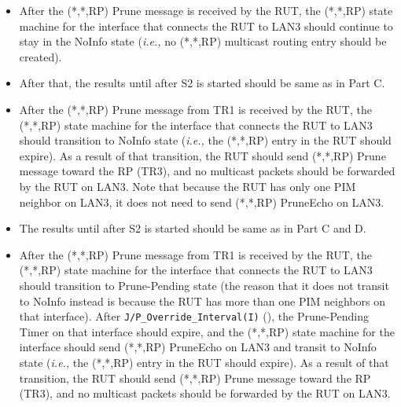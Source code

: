 \documentclass[11pt]{report}
\newcommand{\ie}{\emph{i.e.,}\xspace}
\begin{document}
\begin{itemize}

  \item After the (*,*,RP) Prune message is received by the RUT,
  the (*,*,RP) state machine for the interface that connects the RUT to
  LAN3 should continue to stay in the NoInfo state (\ie no (*,*,RP) multicast
  routing entry should be created).

  \item After that, the results until after S2 is started should be same as in
  Part C.

  \item After the (*,*,RP) Prune message from TR1 is received by the RUT,
  the (*,*,RP) state machine for the interface that connects the RUT to
  LAN3 should transition to NoInfo state
  (\ie the (*,*,RP) entry in the RUT should expire).
  As a result of that transition, the RUT should send (*,*,RP) Prune
  message toward the RP (TR3), and no multicast packets should be
  forwarded by the RUT on LAN3. Note that because the RUT has only one
  PIM neighbor on LAN3, it does not need to send (*,*,RP) PruneEcho on
  LAN3.

\end{itemize}


\begin{itemize}

  \item The results until after S2 is started should be same as in
  Part C and D.

  \item After the (*,*,RP) Prune message from TR1 is received by the RUT,
  the (*,*,RP) state machine for the interface that connects the RUT to
  LAN3 should transition to Prune-Pending state (the reason that it does
  not transit to NoInfo instead is because the RUT has more than one PIM
  neighbors on that interface).
  After \verb=J/P_Override_Interval(I)= (\PimsmJPOverrideIntervalI),
  the Prune-Pending Timer on that interface should expire, and the
  (*,*,RP) state machine for the interface should send (*,*,RP) PruneEcho
  on LAN3 and transit to NoInfo
  state (\ie the (*,*,RP) entry in the RUT should expire).
  As a result of that transition, the RUT should send (*,*,RP) Prune
  message toward the RP (TR3), and no multicast packets should be
  forwarded by the RUT on LAN3.

\end{itemize}

\end{document}
